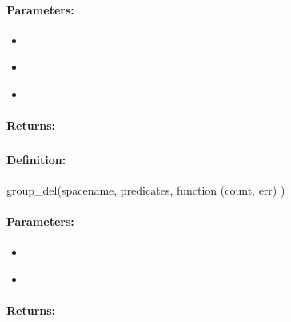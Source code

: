 \paragraph{Parameters:}
\begin{itemize}[noitemsep]
\item {}\\

\item {}\\

\item {}\\

\end{itemize}

\paragraph{Returns:}


\pagebreak
\subsubsection{}
\label{api:nodejs:group_del}


\paragraph{Definition:}
\begin{javascriptcode}
group_del(spacename, predicates, function (count, err) {})
\end{javascriptcode}
\paragraph{Parameters:}
\begin{itemize}[noitemsep]
\item {}\\

\item {}\\

\end{itemize}

\paragraph{Returns:}


